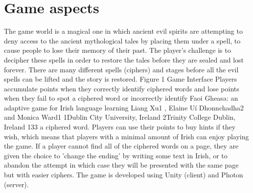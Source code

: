 \documentclass[10pt,twoside,english,a4paper]{article}
\begin{document}
\section{Game aspects }
The game world is a magical one in which ancient evil spirits are attempting to deny access to the ancient mythological tales by placing them under a spell, to cause people to lose their memory of their past. The player's challenge is to decipher these spells in order to restore the tales before they are sealed and lost forever. There are many different spells (ciphers) and stages before all the evil spells can be lifted and the story is restored. Figure 1 Game Interface Players accumulate points when they correctly identify ciphered words and lose points when they fail to spot a ciphered word or incorrectly identify Faoi Gheasa: an adaptive game for Irish language learning Liang Xu1 , Elaine Uí Dhonnchadha2 and Monica Ward1 1Dublin City University, Ireland 2Trinity College Dublin, Ireland 133  a ciphered word. Players can use their points to buy hints if they wish, which means that players with a minimal amount of Irish can enjoy playing the game. If a player cannot find all of the ciphered words on a page, they are given the choice to 'change the ending' by writing some text in Irish, or to abandon the attempt in which case they will be presented with the same page but with easier ciphers. The game is developed using Unity (client) and Photon (server).\\
\end{document}
